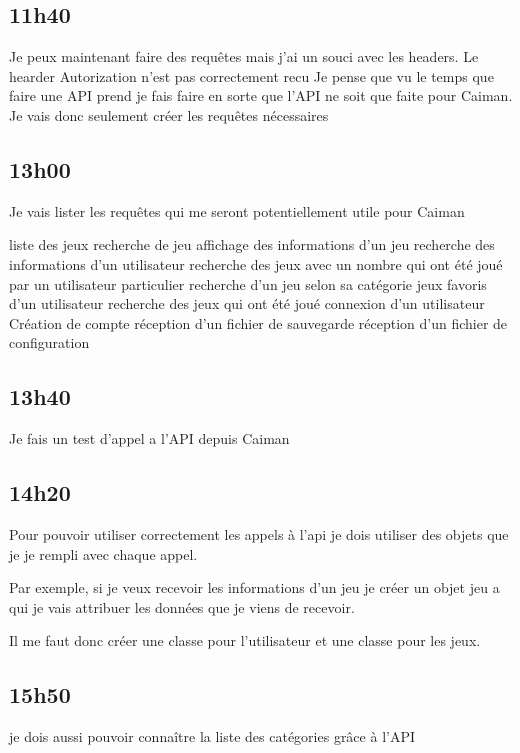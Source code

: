\documentclass[a4paper,12pt,french]{sphinxmanual}
\begin{document}
\subsection{11h40}
\label{\detokenize{logbook:id98}}
\sphinxAtStartPar
Je peux maintenant faire des requêtes mais j’ai un souci avec les headers.
Le hearder Autorization n’est pas correctement recu
Je pense que vu le temps que faire une API prend je fais faire en sorte que l’API ne soit que faite pour Caiman. Je vais donc seulement créer les requêtes nécessaires


\subsection{13h00}
\label{\detokenize{logbook:id99}}
\sphinxAtStartPar
Je vais lister les requêtes qui me seront potentiellement utile pour Caiman

\sphinxAtStartPar
liste des jeux
recherche de jeu
affichage des informations d’un jeu
recherche des informations d’un utilisateur
recherche des jeux avec un nombre qui ont été joué par un utilisateur particulier
recherche d’un jeu selon sa catégorie
jeux favoris d’un utilisateur
recherche des jeux qui ont été joué
connexion d’un utilisateur
Création de compte
réception d’un fichier de sauvegarde
réception d’un fichier de configuration


\subsection{13h40}
\label{\detokenize{logbook:id100}}
\sphinxAtStartPar
Je fais un test d’appel a l’API depuis Caiman


\subsection{14h20}
\label{\detokenize{logbook:id101}}
\sphinxAtStartPar
Pour pouvoir utiliser correctement les appels à l’api je dois utiliser des objets que je je rempli avec chaque appel.

\sphinxAtStartPar
Par exemple, si je veux recevoir les informations d’un jeu je créer un objet jeu a qui je vais attribuer les données que je viens de recevoir.

\sphinxAtStartPar
Il me faut donc créer une classe pour l’utilisateur et une classe pour les jeux.


\subsection{15h50}
\label{\detokenize{logbook:id102}}
\sphinxAtStartPar
je dois aussi pouvoir connaître la liste des catégories grâce à l’API
\end{document}
